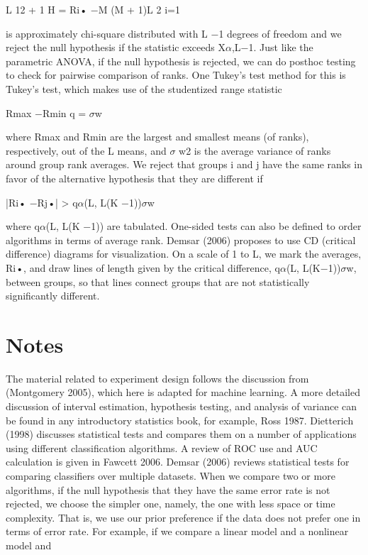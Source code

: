 L 12 + 1 H = Ri• $-$M (M + 1)L 2 i=1

is approximately chi-square distributed with L $-$1 degrees of freedom and we reject the null hypothesis if the statistic exceeds X$\alpha$,L$-$1. Just like the parametric ANOVA, if the null hypothesis is rejected, we can do posthoc testing to check for pairwise comparison of ranks. One Tukey’s test method for this is Tukey’s test, which makes use of the studentized range statistic

Rmax $-$Rmin q = $\sigma$w

where Rmax and Rmin are the largest and smallest means (of ranks), respectively, out of the L means, and $\sigma$ w2 is the average variance of ranks around group rank averages. We reject that groups i and j have the same ranks in favor of the alternative hypothesis that they are different if

|Ri• $-$Rj•| > q$\alpha$(L, L(K $-$1))$\sigma$w

where q$\alpha$(L, L(K $-$1)) are tabulated. One-sided tests can also be defined to order algorithms in terms of average rank. Demsar (2006) proposes to use CD (critical difference) diagrams for visualization. On a scale of 1 to L, we mark the averages, Ri•, and draw lines of length given by the critical difference, q$\alpha$(L, L(K$-$1))$\sigma$w, between groups, so that lines connect groups that are not statistically significantly different.

\section{Notes}

The material related to experiment design follows the discussion from (Montgomery 2005), which here is adapted for machine learning. A more detailed discussion of interval estimation, hypothesis testing, and analysis of variance can be found in any introductory statistics book, for example, Ross 1987. Dietterich (1998) discusses statistical tests and compares them on a number of applications using different classification algorithms. A review of ROC use and AUC calculation is given in Fawcett 2006. Demsar (2006) reviews statistical tests for comparing classifiers over multiple datasets. When we compare two or more algorithms, if the null hypothesis that they have the same error rate is not rejected, we choose the simpler one, namely, the one with less space or time complexity. That is, we use our prior preference if the data does not prefer one in terms of error rate. For example, if we compare a linear model and a nonlinear model and

